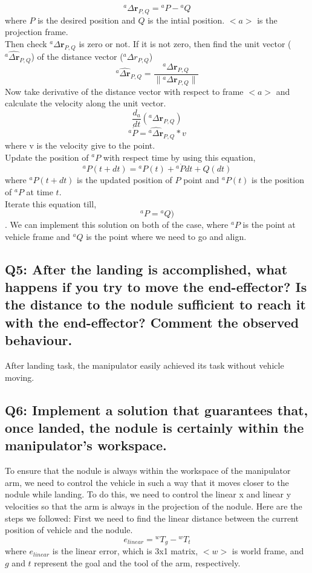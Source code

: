 \documentclass{article}
\begin{document}
   $${}^a\Delta \mathbf{r}_{P,Q} = {}^aP - {}^aQ $$
   where $P$ is the desired position and $Q$ is the intial position. $<a>$ is the projection frame. \\
Then check ${}^a\Delta \mathbf{r}_{P,Q}$ is zero or not. If it is not zero, then find the unit vector (${}^a \widehat{\Delta \mathbf{r}}_{P,Q}$) of the distance vector (${}^a \Delta {r}_{P,Q}$)
$${}^a \widehat{\Delta \mathbf{r}}_{P,Q} = \frac{{}^a \Delta \mathbf{r}_{P,Q}}{\lVert {}^a \Delta \mathbf{r}_{P,Q} \rVert}$$
Now take derivative of the distance vector with respect to frame $<a>$ and calculate the velocity along the unit vector.
$$ \frac{d_a}{dt}({}^a \Delta \mathbf{r}_{P,Q}) $$ 
$${}^a \dot{P} = \widehat{{}^a \Delta \mathbf{r}}_{P,Q} * v$$
where v is the velocity give to the point. \\
Update the position of ${}^a P$ with respect time by using this equation, 
$${}^a P(t+dt) = {}^a P(t) + {}^a \dot{P} dt + Q(dt)$$
where ${}^a P(t+dt)$ is the updated position of $P$ point and ${}^a P(t)$ is the position of ${}^a P$ at time $t$. \\
Iterate this equation till,
$${}^a P = {}^a Q)$$.
We can implement this solution on both of the case, where ${}^a P $ is the point at vehicle frame and ${}^a Q$ is the point where we need to go and align. 




\subsection{Q5: After the landing is accomplished, what happens if you try to move the end-effector? Is the distance to the nodule sufficient to reach it with the end-effector? Comment the observed behaviour.}
After landing task, the manipulator easily achieved its task without vehicle moving. \\ 

\subsection{Q6: Implement a solution that guarantees that, once landed, the nodule is certainly within the manipulator's workspace.}
To ensure that the nodule is always within the workspace of the manipulator arm, we need to control the vehicle in such a way that it moves closer to the nodule while landing. To do this, we need to control the linear x and linear y velocities so that the arm is always in the projection of the nodule. Here are the steps we followed:
First we need to find the linear distance between the current position of vehicle and the nodule.   
    $$e_{linear}  = {}^{w}T_{g} - {}^{w}T_{t}$$
where $e_{linear}$ is the linear error, which is 3x1 matrix, $<w>$ is world frame, and $g$ and $t$ represent the goal and the tool of the arm, respectively.
\end{document}
